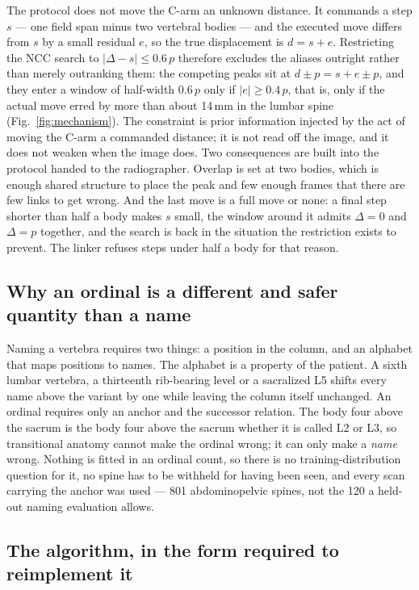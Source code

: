 \documentclass[11pt,letterpaper]{article}
\begin{document}
The protocol does not move the C-arm an unknown distance. It commands a step $s$ --- one field span minus
two vertebral bodies --- and the executed move differs from $s$ by a small residual $e$, so the true
displacement is $d=s+e$. Restricting the NCC search to $|\Delta-s|\le 0.6\,p$ therefore excludes the
aliases outright rather than merely outranking them: the competing peaks sit at $d\pm p = s+e\pm p$, and
they enter a window of half-width $0.6\,p$ only if $|e|\ge 0.4\,p$, that is, only if the actual move erred
by more than about 14\,mm in the lumbar spine (Fig.~\ref{fig:mechanism}). The constraint is prior
information injected by the act of moving the C-arm a commanded distance; it is not read off the image, and
it does not weaken when the image does. Two consequences are built into the protocol handed to the
radiographer. Overlap is set at two bodies,
which is enough shared structure to place the peak and few enough frames that there are few links to get
wrong. And the last move is a full move or none: a final step shorter than half a body makes $s$ small, the
window around it admits $\Delta=0$ and $\Delta=p$ together, and the search is back in the situation the
restriction exists to prevent. The linker refuses steps under half a body for that reason.

\subsection*{Why an ordinal is a different and safer quantity than a name}

Naming a vertebra requires two things: a position in the column, and an alphabet that maps positions to
names. The alphabet is a property of the patient. A sixth lumbar vertebra, a thirteenth rib-bearing level
or a sacralized L5 shifts every name above the variant by one while leaving the column itself unchanged.
An ordinal requires only an anchor and the successor relation. The body four above the sacrum is the body
four above the sacrum whether it is called L2 or L3, so transitional anatomy cannot make the ordinal wrong;
it can only make a \emph{name} wrong. Nothing is fitted in an ordinal count, so there is no
training-distribution question for it, no spine has to be withheld for having been seen, and every scan
carrying the anchor was used --- 801 abdominopelvic spines, not the 120 a held-out naming evaluation
allows.

\subsection*{The algorithm, in the form required to reimplement it}
\end{document}
